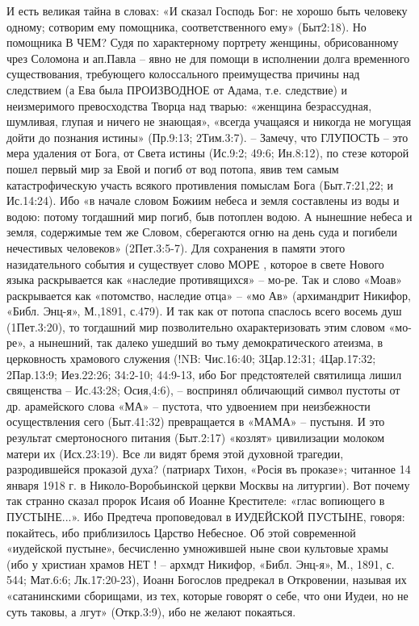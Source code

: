      И есть великая тайна в словах:  «И сказал Господь Бог: не хорошо быть человеку одному;  сотворим ему помощника, соответственного ему» (Быт2:18). Но помощника В ЧЕМ?  Судя по характерному портрету женщины, обрисованному чрез Соломона и ап.Павла – явно не для помощи в исполнении долга временного существования, требующего колоссального преимущества причины над следствием (а Ева была ПРОИЗВОДНОЕ от Адама, т.е. следствие) и неизмеримого превосходства Творца над тварью: «женщина безрассудная, шумливая, глупая и ничего не знающая», «всегда учащаяся и никогда не могущая дойти до познания истины» (Пр.9:13; 2Тим.3:7). – Замечу, что ГЛУПОСТЬ – это мера удаления от Бога, от Света истины (Ис.9:2; 49:6; Ин.8:12), по стезе которой пошел первый мир за Евой и погиб от вод потопа, явив тем самым катастрофическую участь всякого противления помыслам Бога (Быт.7:21,22; и Ис.14:24).  Ибо «в начале словом Божиим небеса и земля составлены из воды и водою: потому тогдашний мир погиб, быв потоплен водою. А нынешние небеса и земля, содержимые тем же Словом, сберегаются огню на день суда и погибели нечестивых человеков» (2Пет.3:5-7).
     Для сохранения в памяти этого назидательного события и существует слово МОРЕ , которое в свете Нового языка раскрывается как «наследие противящихся» – мо-ре. Так и слово «Моав» раскрывается как «потомство, наследие отца» – «мо Ав» (архимандрит Никифор, «Библ. Энц-я», М.,1891, с.479). И так как от потопа спаслось всего восемь душ (1Пет.3:20), то тогдашний мир позволительно охарактеризовать этим словом «мо-ре», а нынешний, так далеко ушедший во тьму демократического атеизма, в церковность храмового служения (!NB:  Чис.16:40; 3Цар.12:31; 4Цар.17:32; 2Пар.13:9; Иез.22:26; 34:2-10; 44:9-13, ибо Бог предстоятелей святилища лишил священства – Ис.43:28; Осия,4:6), – воспринял обличающий символ пустоты от др. арамейского слова «МА» – пустота, что удвоением при неизбежности осуществления сего (Быт.41:32) превращается в «МАМА» – пустыня. И это результат смертоносного питания (Быт.2:17) «козлят» цивилизации молоком матери их (Исх.23:19). Все ли видят бремя этой духовной трагедии, разродившейся проказой духа? (патриарх Тихон, «Росія въ проказе»; читанное 14 января 1918 г. в Николо-Воробьинской церкви Москвы на литургии).
     Вот почему так странно сказал пророк Исаия об Иоанне Крестителе: «глас вопиющего в ПУСТЫНЕ...». Ибо Предтеча проповедовал в ИУДЕЙСКОЙ ПУСТЫНЕ, говоря: покайтесь, ибо приблизилось Царство Небесное. Об этой современной «иудейской пустыне», бесчисленно умножившей ныне свои культовые храмы (ибо у христиан храмов НЕТ ! – архмдт Никифор, «Библ. Энц-я», М., 1891, с. 544; Мат.6:6; Лк.17:20-23), Иоанн Богослов предрекал в Откровении, называя их «сатанинскими сборищами, из тех, которые говорят о себе, что они Иудеи, но не суть таковы, а лгут» (Откр.3:9), ибо не желают покаяться.

